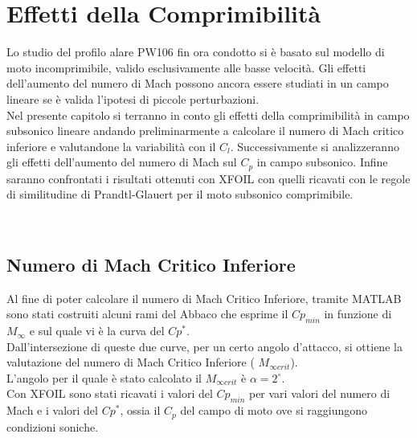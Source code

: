 \chapter{Effetti della Comprimibilità}

Lo studio del profilo alare PW106 fin ora condotto si è basato sul modello di moto incomprimibile, valido esclusivamente alle basse velocità. Gli effetti dell’aumento del numero di Mach possono ancora essere studiati in un campo lineare se è valida l’ipotesi di piccole perturbazioni.\\
Nel presente capitolo si terranno in conto gli effetti della comprimibilità in campo subsonico lineare andando preliminarmente a calcolare il numero di Mach critico inferiore e valutandone la variabilità con il $C_l$. Successivamente si analizzeranno gli effetti dell'aumento del numero di Mach sul $C_{p}$ in campo subsonico.
Infine saranno confrontati i risultati ottenuti con XFOIL con quelli ricavati con le regole di similitudine di Prandtl-Glauert per il moto subsonico comprimibile.

\noindent \\
\section{Numero di Mach Critico Inferiore}


Al fine di poter calcolare il numero di Mach Critico Inferiore, tramite MATLAB  sono stati costruiti alcuni rami del Abbaco che esprime il $Cp_{min}$ in funzione di $M_{\infty}$ e sul quale vi è la curva del $Cp^{*}$. \\ Dall’intersezione di queste due curve, per un certo angolo d’attacco, si ottiene la valutazione del numero di Mach Critico Inferiore ( $M_{\infty crit}$).\\ 

L’angolo per il quale è stato calcolato il $M_{\infty crit}$ è  ${\alpha}=2^\circ$.\\

Con XFOIL sono stati ricavati i valori del $Cp_{min}$ per vari valori del numero di Mach e i valori del $Cp^*$, ossia il $C_p$ del campo di moto ove si raggiungono condizioni soniche.


